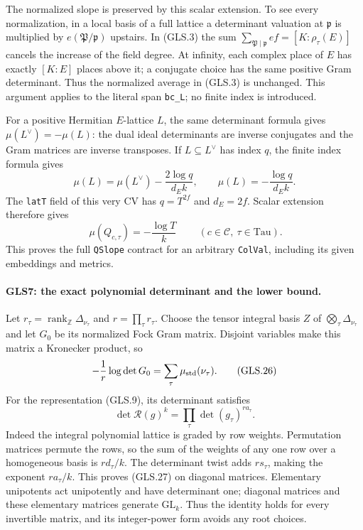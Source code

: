 The normalized slope is preserved by this scalar extension.  To
see every normalization, in a local basis of a full lattice a
determinant valuation at $\mathfrak p$ is multiplied by
$e(\mathfrak P/\mathfrak p)$ upstairs.  In (GLS.3) the sum
$\sum_{\mathfrak P\mid\mathfrak p}ef=[K:\rho_\tau(E)]$
cancels the increase of the field degree.  At infinity, each
complex place of $E$ has exactly $[K:E]$ places above it; a conjugate
choice has the same positive Gram determinant.  Thus the normalized
average in (GLS.3) is unchanged.  This argument applies to the
literal span \texttt{bc\_L}; no finite index is introduced.

For a positive Hermitian $E$-lattice $L$, the same determinant
formula gives $\mu(L^\vee)=-\mu(L)$: the dual ideal determinants
are inverse conjugates and the Gram matrices are inverse
transposes.  If $L\subseteq L^\vee$ has index $q$, the finite index
formula gives
\[
 \mu(L)=\mu(L^\vee)-\frac{2\log q}{d_E k},
 \qquad \mu(L)=-\frac{\log q}{d_E k}.          \tag{GLS.24}
\]
The \texttt{latT} field of this very $\mathrm{CV}$ has
$q=T^{2f}$ and $d_E=2f$.  Scalar extension therefore gives
\[
             \boxed{\ \mu(Q_{c,\tau})=-\frac{\log T}{k}\ }
                  \qquad(c\in\mathcal C,\ \tau\in\mathrm{Tau}).
 \tag{GLS.25}
\]
This proves the full \texttt{QSlope} contract for an arbitrary
\texttt{ColVal}, including its given embeddings and metrics.

\paragraph{GLS7: the exact polynomial determinant and the lower bound.}
\label{claim:GLS7}
Let $r_\tau=\operatorname{rank}_{\mathbb Z}\Delta_{\nu_\tau}$ and
$r=\prod_\tau r_\tau$.  Choose the tensor integral basis $Z$ of
$\bigotimes_\tau\Delta_{\nu_\tau}$ and let $G_0$ be its normalized
Fock Gram matrix.  Disjoint variables make this matrix a Kronecker
product, so
\[
 -\frac1r\log\det G_0=\sum_\tau\mu_{\rm std}(\nu_\tau).
 \tag{GLS.26}
\]
For the representation (GLS.9), its determinant satisfies
\[
 \det\mathcal R(g)^k=\prod_\tau\det(g_\tau)^{r a_\tau}.
 \tag{GLS.27}
\]
Indeed the integral polynomial lattice is graded by row weights.
Permutation matrices permute the rows, so the sum of the weights
of any one row over a homogeneous basis is $rd_\tau/k$.
The determinant twist adds $rs_\tau$, making the exponent
$ra_\tau/k$.  This proves (GLS.27) on diagonal matrices.
Elementary unipotents act unipotently and have determinant one;
diagonal matrices and these elementary matrices generate
$\mathrm{GL}_k$.  Thus the identity holds for every invertible
matrix, and its integer-power form avoids any root choices.

